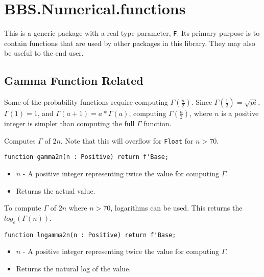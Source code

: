 \documentclass[10pt, openany]{book}
\newcommand{\datatype}[1]{\texttt{#1}}
\begin{document}
\section{BBS.Numerical.functions}
This is a generic package with a real type parameter, \datatype{F}.  Its primary purpose is to contain functions that are used by other packages in this library.  They may also be useful to the end user.

\subsection{Gamma Function Related}
Some of the probability functions require computing $\Gamma(\frac{n}{2})$.  Since $\Gamma(\frac{1}{2})=\sqrt{pi}$, $\Gamma(1) = 1$, and $\Gamma(a+1) = a*\Gamma(a)$, computing $\Gamma(\frac{n}{2})$, where $n$ is a positive integer is simpler than computing the full $\Gamma$ function.

Computes $\Gamma$ of $2n$.  Note that this will overflow for \datatype{Float} for $n>70$.
\begin{lstlisting}
function gamma2n(n : Positive) return f'Base;
\end{lstlisting}
\begin{itemize}
  \item $n$ - A positive integer representing twice the value for computing $\Gamma$.
  \item Returns the actual value.
\end{itemize}

To compute $\Gamma$ of $2n$ where $n>70$, logarithms can be used.  This returns the $log_e(\Gamma(n))$.
\begin{lstlisting}
function lngamma2n(n : Positive) return f'Base;
\end{lstlisting}
\begin{itemize}
  \item $n$ - A positive integer representing twice the value for computing $\Gamma$.
  \item Returns the natural log of the value.
\end{itemize}
\end{document}
